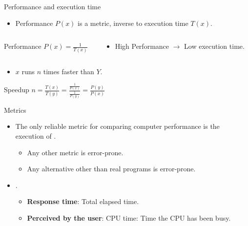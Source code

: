\begin{frame}[t]{Performance and execution time}
\begin{itemize}
  \item Performance $P(x)$ is a metric, inverse to
        execution time $T(x)$.
\end{itemize}

\begin{columns}
\begin{column}{.4\textwidth}
\begin{block}{Performance}
\begin{math}
P(x) = \frac{1}{T(x)}
\end{math}
\end{block}
\end{column}
\begin{column}{.6\textwidth}
\begin{itemize}
  \item High Performance $\rightarrow$ Low execution time.
\end{itemize}
\end{column}
\end{columns}

\begin{itemize}
  \item $x$ runs $n$ times faster than $Y$.
\end{itemize}
\begin{block}{Speedup}
\begin{math}
n=\frac{T(x)}{T(y)}=
\frac{
\frac{1}{P(x)}
}{
\frac{1}{P(y)}
}
=
\frac{P(y)}{P(x)}
\end{math}
\end{block}
\end{frame}

\begin{frame}[t]{Metrics}
\begin{itemize}
  \item The \alert{only} reliable metric for comparing computer performance
        is the execution of .
    \begin{itemize}
      \item Any other metric is error-prone.
      \item Any alternative other than real programs is error-prone.
    \end{itemize}

  \item {}.
    \begin{itemize}
      \item \textbf{Response time}: 
            Total elapsed time.
      \item \textbf{Perceived by the user}:
            CPU time: Time the CPU has been busy.
    \end{itemize}
\end{itemize}
\end{frame}

